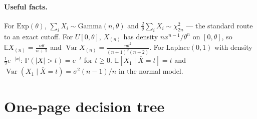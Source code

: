 \documentclass[11pt]{article}
\theoremstyle{remark}
\newcommand{\E}{\mathbb{E}}
\newcommand{\Var}{\operatorname{Var}}
\newcommand{\Prob}{\mathbb{P}}
\newcommand{\Xbar}{\overline{X}}
\begin{document}
\paragraph{Useful facts.}
For $\mathrm{Exp}(\theta)$, $\sum_i X_i\sim\mathrm{Gamma}(n,\theta)$ and
$\tfrac{2}{\theta}\sum_i X_i\sim\chi^2_{2n}$ --- the standard route to an exact cutoff.
For $U[0,\theta]$, $X_{(n)}$ has density $n x^{n-1}/\theta^n$ on $[0,\theta]$, so
$\E X_{(n)}=\frac{n\theta}{n+1}$ and $\Var X_{(n)}=\frac{n\theta^2}{(n+1)^2(n+2)}$.
For Laplace$(0,1)$ with density $\tfrac12 e^{-|x|}$: $\Prob(|X|>t)=e^{-t}$ for $t\ge0$.
$\E[X_1\mid\Xbar=t]=t$ and $\Var(X_1\mid\Xbar=t)=\sigma^2(n-1)/n$ in the normal model.

\section{One-page decision tree}
\end{document}
